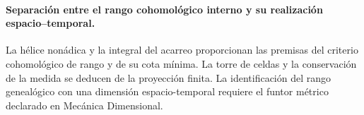 \paragraph{Separación entre el rango cohomológico interno y su realización espacio--temporal.}
La hélice nonádica y la integral del acarreo proporcionan las premisas del
criterio cohomológico de rango y de su cota mínima. La torre de celdas y la
conservación de la medida se deducen de la proyección finita. La identificación
del rango genealógico con una dimensión espacio-temporal requiere el funtor
métrico declarado en Mecánica Dimensional.
